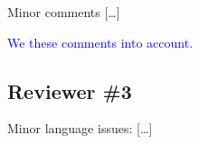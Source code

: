 \documentclass[11pt]{article}
\newcommand{\answer}[1]{\textcolor{blue}{#1}\vspace*{1em}}
\begin{document}
Minor comments […]
% 
% 

\answer{
We these comments into account.
}



\subsection*{Reviewer \#3}

Minor language issues: […]

\end{document}
